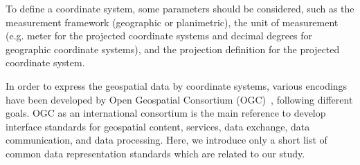 \documentclass[a4paper,12pt]{article}
\begin{document}
To define a coordinate system, some parameters should be considered, such as the measurement framework (geographic  or planimetric), the unit of measurement (e.g. meter for the projected coordinate systems and decimal degrees for geographic coordinate systems), and the projection definition for the projected coordinate system.

In order to express the geospatial data by coordinate systems, various encodings have been developed by Open Geospatial Consortium (OGC)~\cite{ogc}, following different goals. OGC as an international consortium is the main reference to develop interface standards for geospatial content, services, data exchange, data communication, and data processing. Here, we introduce only a short list of common data representation standards which are related to our study.
\end{document}
